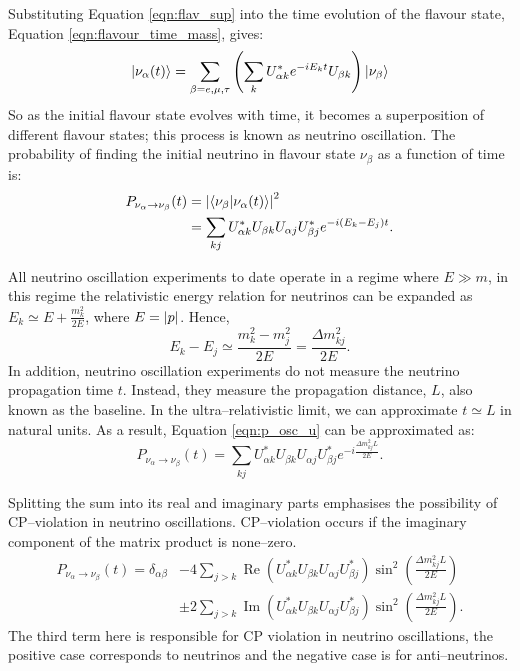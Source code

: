 Substituting Equation \ref{eqn:flav_sup} into the time evolution of the flavour
state, Equation \ref{eqn:flavour_time_mass}, gives:
\begin{equation*}
	\ket{\nu_\alpha(t)} = \sum_{\beta = e, \mu, \tau} \left(\sum_k
	U^*_{\alpha k} e^{-iE_kt} U_{\beta k} \right) \ket{\nu_{\beta}} 
\end{equation*}
So as the initial flavour state evolves with time, it becomes a superposition 
of different flavour states; this process is known as neutrino oscillation.
The probability of finding the initial neutrino in flavour state \(\nu_\beta\) 
as a function of time is:
\begin{align}
	\label{eqn:p_osc_u}
	P_{\nu_\alpha \rightarrow \nu_\beta}(t) &= \abs{\braket{\nu_\beta}{\nu_\alpha(t)}}^2 \nonumber \\
	                                        &= \sum_{kj} U^*_{\alpha k} U_{\beta k} U_{\alpha j} U^*_{\beta j} e^{-i(E_k - E_j)t}.
\end{align}

All neutrino oscillation experiments to date operate in a regime where 
\(E \gg m\), in this regime the relativistic energy relation for neutrinos can 
be expanded as \({E_k \simeq E + \frac{m_k^2}{2E}}\), where \(E = \abs{p}\). 
Hence, 
\begin{equation*}
	E_k - E_j \simeq \frac{m_k^2 - m_j^2}{2E} = \frac{\Delta m_{kj}^2}{2E}.
\end{equation*}
In addition, neutrino oscillation experiments do not measure the neutrino
propagation time \(t\). Instead, they measure the propagation distance, \(L\), 
also known as the baseline. In the ultra--relativistic limit, we can approximate
\({t \simeq L}\) in natural units. As a result, Equation \ref{eqn:p_osc_u} can 
be approximated as:
\begin{equation*}
	P_{\nu_\alpha \rightarrow \nu_\beta}(t) = \sum_{kj} U^*_{\alpha k} U_{\beta k} U_{\alpha j} U^*_{\beta j} e^{-i\frac{\Delta m^2_{kj}L}{2E}}.
\end{equation*}

Splitting the sum into its real and imaginary parts emphasises the possibility
of CP--violation in neutrino oscillations. CP--violation occurs if the imaginary
component of the matrix product is none--zero. 
\begin{align*}
	P_{\nu_\alpha \rightarrow \nu_\beta}(t) = \delta_{\alpha \beta} 
	&- 4 \sum_{j > k} \operatorname{Re}(U^*_{\alpha k} U_{\beta k} U_{\alpha j} U^*_{\beta j}) \sin^2(\frac{\Delta m^2_{kj} L}{2E}) \nonumber \\
	&\pm 2 \sum_{j > k} \operatorname{Im}(U^*_{\alpha k} U_{\beta k} U_{\alpha j} U^*_{\beta j}) \sin^2(\frac{\Delta m^2_{kj} L}{2E}).
\end{align*}
The third term here is responsible for CP violation in neutrino oscillations,
the positive case corresponds to neutrinos and the negative case is for
anti--neutrinos.

